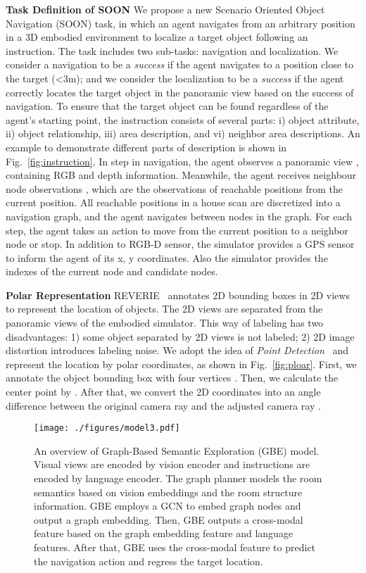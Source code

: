 \documentclass[final]{cvpr}
\begin{document}
\noindent\textbf{Task Definition of SOON} 
We propose a new Scenario Oriented Object Navigation (SOON) task, in which an agent navigates from an arbitrary position in a 3D embodied environment to localize a target object following an instruction. 
The task includes two sub-tasks: navigation and localization. 
We consider a navigation to be a \emph{success} if the agent navigates to a position close to the target (<3m);
and we consider the localization to be a \emph{success} if the agent correctly locates the target object in the panoramic view based on the success of navigation. 
To ensure that the target object can be found regardless of the agent's starting point, the instruction consists of several parts: i) object attribute, ii) object relationship, iii) area description, and vi) neighbor area descriptions. 
An example to demonstrate different parts of description is shown in Fig.~\ref{fig:instruction}. 
In step  in navigation, the agent observes a panoramic view , containing RGB and depth information. 
Meanwhile, the agent receives neighbour node observations , which are the observations of  reachable positions from the current position. 
All reachable positions in a house scan are discretized into a navigation graph, and the agent navigates between nodes in the graph. 
For each step, the agent takes an action  to move from the current position to a neighbor node or stop. 
In addition to RGB-D sensor, the simulator provides a GPS sensor to inform the agent of its x, y coordinates. Also the simulator provides the indexes of the current node and candidate nodes. 



\noindent\textbf{Polar Representation} 
\label{sec:polar}
REVERIE~\cite{qi2019reverie} annotates 2D bounding boxes in 2D views to represent the location of objects. The 2D views are separated from the panoramic views of the embodied simulator. 
This way of labeling has two disadvantages: 1) some object separated by 2D views is not labeled; 2) 2D image distortion introduces labeling noise. 
We adopt the idea of \emph{Point Detection}~\cite{oquab2015object, zhu2017soft} and represent the location by polar coordinates, as shown in Fig.~\ref{fig:ploar}. 
First, we annotate the object bounding box with four vertices . Then, we calculate the center point by . After that, we convert the 2D coordinates into an angle difference between the original camera ray  and the adjusted camera ray . 
\begin{figure*}[t]
\centering
\texttt{[image: ./figures/model3.pdf]}
\caption{
An overview of Graph-Based Semantic Exploration (GBE) model. 
Visual views are encoded by vision encoder and instructions are encoded by language encoder. The graph planner models the room semantics based on vision embeddings and the room structure information. 
GBE employs a GCN to embed graph nodes and output a graph embedding. 
Then, GBE outputs a cross-modal feature based on the graph embedding feature and language features. 
After that, GBE uses the cross-modal feature to predict the navigation action and regress the target location. 
}
 \vspace{-7pt}
\label{fig:model}
\end{figure*}
\end{document}

